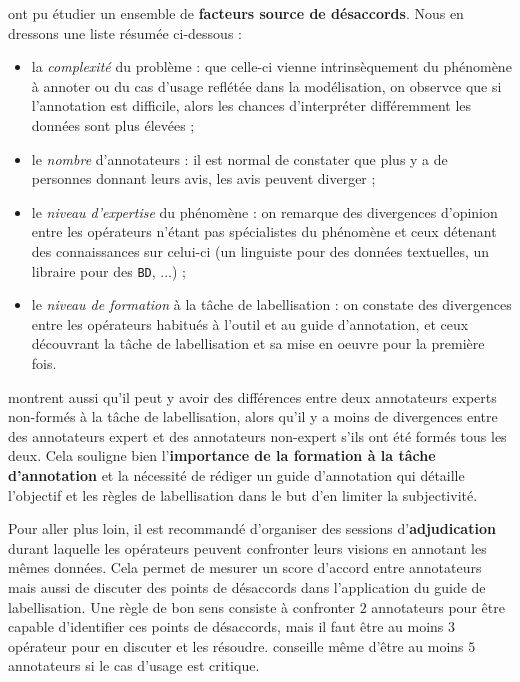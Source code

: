 			\cite{bayerl-paul:2011:what-determines-intercoder} ont pu étudier un ensemble de \textbf{facteurs source de désaccords}. Nous en dressons une liste résumée ci-dessous :
			\begin{itemize}
				\item la \textit{complexité} du problème :
				que celle-ci vienne intrinsèquement du phénomène à annoter ou du cas d'usage reflétée dans la modélisation, on observce que si l'annotation est difficile, alors les chances d'interpréter différemment les données sont plus élevées ;
				\item le \textit{nombre} d'annotateurs :
				il est normal de constater que plus y a de personnes donnant leurs avis, les avis peuvent diverger ;
				\item le \textit{niveau d'expertise} du phénomène :
				on remarque des divergences d'opinion entre les opérateurs n'étant pas spécialistes du phénomène et ceux détenant des connaissances sur celui-ci (un linguiste pour des données textuelles, un libraire pour des \texttt{BD}, ...) ;
				\item le \textit{niveau de formation} à la tâche de labellisation :
				on constate des divergences entre les opérateurs habitués à l'outil et au guide d'annotation, et ceux découvrant la tâche de labellisation et sa mise en oeuvre pour la première fois.
			\end{itemize}
			\begin{leftBarInformation}
				\cite{bayerl-paul:2011:what-determines-intercoder} montrent aussi qu'il peut y avoir des différences entre deux annotateurs experts non-formés à la tâche de labellisation, alors qu'il y a moins de divergences entre des annotateurs expert et des annotateurs non-expert s'ils ont été formés tous les deux.
				Cela souligne bien l'\textbf{importance de la formation à la tâche d'annotation} et la nécessité de rédiger un guide d'annotation qui détaille l'objectif et les règles de labellisation dans le but d'en limiter la subjectivité.
			\end{leftBarInformation}
			\begin{leftBarIdea}
				Pour aller plus loin, il est recommandé d'organiser des sessions d'\textbf{adjudication} durant laquelle les opérateurs peuvent confronter leurs visions en annotant les mêmes données.
				Cela permet de mesurer un score d'accord entre annotateurs mais aussi de discuter des points de désaccords dans l'application du guide de labellisation.
				Une règle de bon sens consiste à confronter $2$ annotateurs pour être capable d'identifier ces points de désaccords, mais il faut être au moins $3$ opérateur pour en discuter et les résoudre.
				\cite{bayerl-paul:2011:what-determines-intercoder} conseille même d'être au moins $5$ annotateurs si le cas d'usage est critique.
			\end{leftBarIdea}
		
